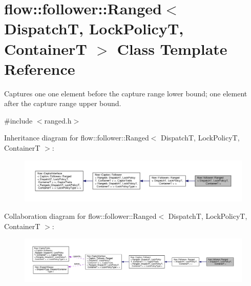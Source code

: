 \hypertarget{classflow_1_1follower_1_1_ranged}{}\section{flow\+:\+:follower\+:\+:Ranged$<$ DispatchT, Lock\+PolicyT, ContainerT $>$ Class Template Reference}
\label{classflow_1_1follower_1_1_ranged}


Captures one one element before the capture range lower bound; one element after the capture range upper bound.  




{\ttfamily \#include $<$ranged.\+h$>$}



Inheritance diagram for flow\+:\+:follower\+:\+:Ranged$<$ DispatchT, Lock\+PolicyT, ContainerT $>$\+:\nopagebreak
\begin{figure}[H]
\begin{center}
\leavevmode
\includegraphics[width=350pt]{classflow_1_1follower_1_1_ranged__inherit__graph}
\end{center}
\end{figure}


Collaboration diagram for flow\+:\+:follower\+:\+:Ranged$<$ DispatchT, Lock\+PolicyT, ContainerT $>$\+:\nopagebreak
\begin{figure}[H]
\begin{center}
\leavevmode
\includegraphics[width=350pt]{classflow_1_1follower_1_1_ranged__coll__graph}
\end{center}
\end{figure}
